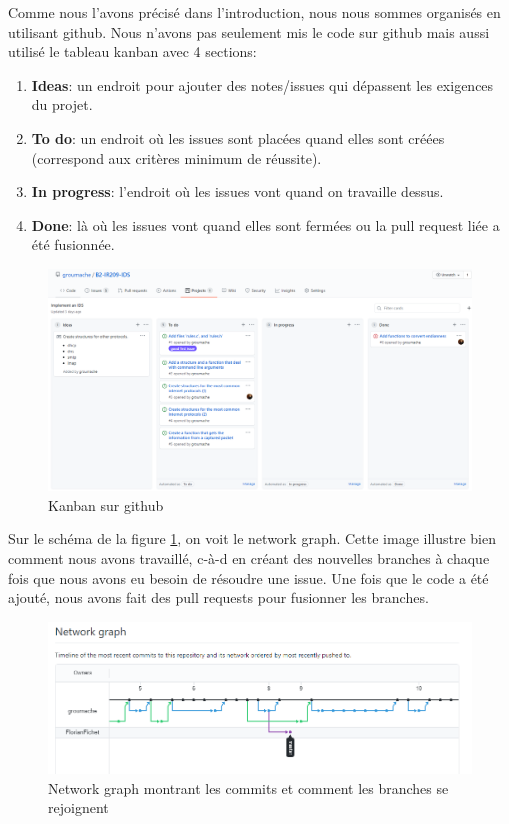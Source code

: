 \documentclass[a4paper]{article}
\begin{document}
Comme nous l'avons précisé dans l'introduction, nous nous sommes organisés en utilisant github. Nous n'avons pas seulement mis le code sur github mais aussi utilisé le tableau kanban avec 4 sections:
\begin{enumerate}
    \item \textbf{Ideas}: un endroit pour ajouter des notes/issues qui dépassent les exigences du projet.
    \item \textbf{To do}: un endroit où les issues sont placées quand elles sont créées (correspond aux critères minimum de réussite).
    \item \textbf{In progress}: l'endroit où les issues vont quand on travaille dessus.
    \item \textbf{Done}: là où les issues vont quand elles sont fermées ou la pull request liée a été fusionnée.
\end{enumerate}
\begin{figure}[H]
    \centering
    \includegraphics[width=0.99\linewidth]{../markdown-explanations/images/project-1.PNG}
    \caption{Kanban sur github}
\end{figure}

Sur le schéma de la figure \ref{fig:networkgraph}, on voit le network graph. Cette image illustre bien comment nous avons travaillé, c-à-d en créant des nouvelles branches à chaque fois que nous avons eu besoin de résoudre une issue. Une fois que le code a été ajouté, nous avons fait des pull requests pour fusionner les branches.
\begin{figure}[H]
    \centering
    \includegraphics[width=0.99\linewidth]{../markdown-explanations/images/project-2.PNG}
    \caption{Network graph montrant les commits et comment les branches se rejoignent}
    \label{fig:networkgraph}
\end{figure}
\end{document}
